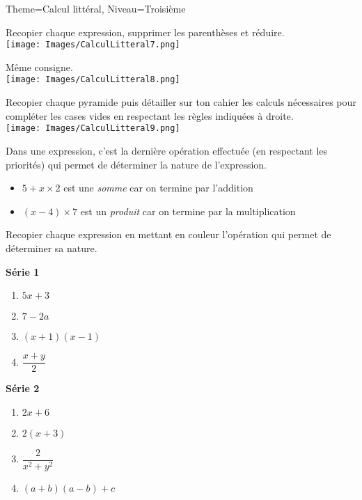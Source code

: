\documentclass[11pt]{article}
\begin{document}
\begin{multicols}{2}
\begin{Maquette}[Fiche]{Theme=Calcul littéral, Niveau=Troisième}
        \begin{exercice}
            Recopier chaque expression, supprimer les parenthèses et réduire.\\
            \texttt{[image: Images/CalculLitteral7.png]}
        \end{exercice}

        \begin{exercice}
            Même consigne.\\
            \texttt{[image: Images/CalculLitteral8.png]}
        \end{exercice}

        \begin{exercice}
            Recopier chaque pyramide puis détailler sur ton cahier les calculs nécessaires pour compléter les cases vides en respectant les règles indiquées à droite.\\
            \texttt{[image: Images/CalculLitteral9.png]}
        \end{exercice}

        \begin{exercice}
            Dans une expression, c’est la dernière opération effectuée (en respectant les priorités) qui permet de déterminer la nature de l’expression.
            \begin{itemize}
                \item $5 + x \times 2$ est une \emph{somme} car on termine par l’addition
                \item $(x - 4) \times 7$ est un \emph{produit} car on termine par la multiplication
            \end{itemize}
            Recopier chaque expression en mettant en couleur l’opération qui permet de déterminer sa nature.
            \begin{multicols}{2}
                \textbf{Série 1}
                \begin{enumerate}[label=\textbf{\alph*.}]
                    \item $ 5x + 3$
                    \item $ 7 - 2a $
                    \item $ (x + 1)(x- 1)$
                    \item $ \dfrac{x+y}{2}$
                \end{enumerate}
                \textbf{Série 2}
                \begin{enumerate}[label=\textbf{\alph*.}]
                    \item $ 2x + 6$
                    \item $ 2(x+3) $
                    \item $ \dfrac{2}{x^2 + y^2}$
                    \item $ (a+b)(a-b)+c$
                \end{enumerate}
            \end{multicols}
        \end{exercice}


\end{Maquette}
\end{multicols}
\end{document}
